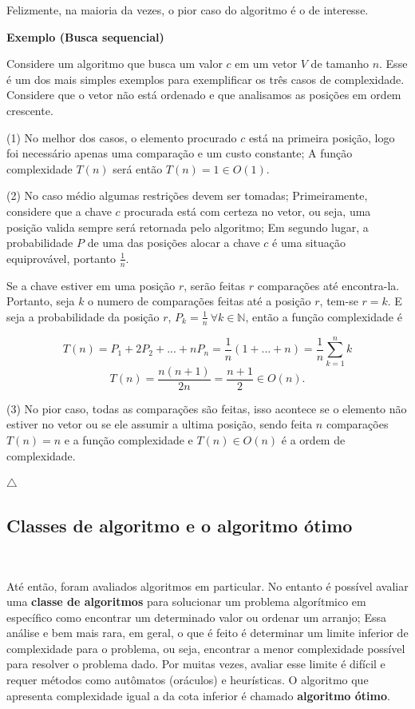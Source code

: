 Felizmente, na maioria da vezes, o pior caso do algoritmo é o de interesse.

\textbf{Exemplo (Busca sequencial)}

Considere um algoritmo que busca um valor $c$ em um vetor $V$ de tamanho $n$. Esse é um dos mais simples exemplos para exemplificar os três casos de complexidade. Considere que o vetor não está ordenado e que analisamos as posições em ordem crescente.

(1) No melhor dos casos, o elemento procurado $c$ está na primeira posição, logo foi necessário apenas uma comparação e um custo constante; A função complexidade $T(n)$ será então $T(n) = 1 \in O(1)$.

(2) No caso médio algumas restrições devem ser tomadas; Primeiramente, considere que a chave $c$ procurada está com certeza no vetor, ou seja, uma posição valida sempre será retornada pelo algoritmo; Em segundo lugar, a probabilidade $P$ de uma das posições alocar a chave $c$ é uma situação equiprovável, portanto $\frac{1}{n}$.

Se a chave estiver em uma posição $r$, serão feitas $r$ comparações até encontra-la. Portanto, seja $k$ o numero de comparações feitas até a posição $r$, tem-se $r=k$. E seja a probabilidade da posição $r$, $P_k = \frac{1}{n} \ \forall k \in \mathbb{N}$, então a função complexidade é 

\[T(n) = P_1 + 2P_2 + ... + nP_n = \frac{1}{n}(1+...+n) = \frac{1}{n}\sum_{k=1}^n k\]
\[T(n)=\frac{n(n+1)}{2n} = \frac{n+1}{2} \in O(n).\]

(3) No pior caso, todas as comparações são feitas, isso acontece se o elemento não estiver no vetor ou se ele assumir a ultima posição, sendo feita $n$ comparações $T(n)=n$ e a função complexidade e $T(n) \in O(n)$ é a ordem de complexidade.

{\raggedleft $\bigtriangleup$ \par}

\subsection{Classes de algoritmo e o algoritmo ótimo}
\

Até então, foram avaliados algoritmos em particular. No entanto é possível avaliar uma \textbf{classe de algoritmos} para solucionar um problema algorítmico em específico como encontrar um determinado valor ou ordenar um arranjo; Essa análise e bem mais rara, em geral, o que é feito é determinar um limite inferior de complexidade para o problema, ou seja, encontrar a menor complexidade possível para resolver o problema dado. Por muitas vezes, avaliar esse limite é difícil e requer métodos como autômatos (oráculos) e heurísticas. O algoritmo que apresenta complexidade igual a da cota inferior é chamado \textbf{algoritmo ótimo}.